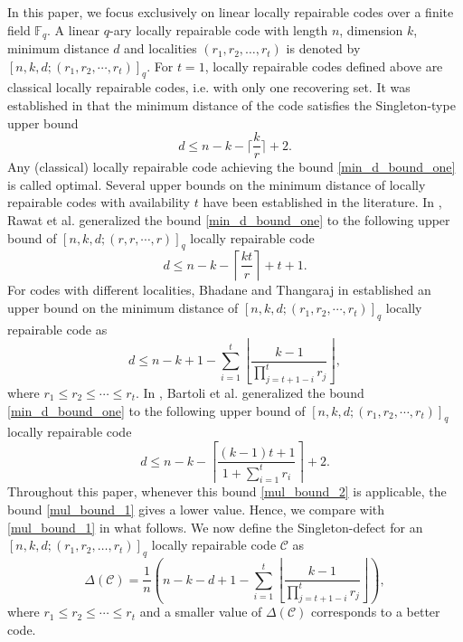 \documentclass[journal,12pt,onecolumn]{IEEEtran}
\begin{document}
In this paper, we focus exclusively on linear locally repairable codes over a finite field \( \mathbb{F}_q \). A linear \(q\)-ary locally repairable code with length \( n \), dimension \( k \), minimum distance \( d \) and localities \((r_1, r_2, \dots, r_t)\) is denoted by \([n, k, d; (r_1, r_2, \cdots, r_t)]_q\). For $t = 1$, locally repairable codes defined above are classical locally repairable codes, i.e. with only one recovering set. It was established in \cite{On_the_Locality_of_Codeword_Symbols} that the minimum distance of the code satisfies the Singleton-type upper bound
\begin{equation}\label{min_d_bound_one}
    d\le n-k-\bigg\lceil\frac{k}{r}\bigg\rceil+2.
\end{equation}
Any (classical) locally repairable code achieving the bound \eqref{min_d_bound_one} is called optimal. Several upper bounds on the minimum distance of locally repairable codes with availability $t$ have been established in the literature. In \cite{7398062}, Rawat et al. generalized the bound \eqref{min_d_bound_one} to the following upper bound of \([n, k, d; (r, r, \cdots, r)]_q\) locally repairable code
\begin{equation*}
    d \leq n - k - \left\lceil \frac{kt}{r} \right\rceil + t + 1. 
\end{equation*}
For codes with different localities, Bhadane and Thangaraj in \cite{8077091} established an upper bound on the minimum distance of \([n, k, d; (r_1, r_2, \cdots, r_t)]_q\) locally repairable code as
\begin{equation}\label{mul_bound_1}
    d \leq n - k + 1 - \sum_{i=1}^t \left\lfloor \frac{k-1}{\prod_{j=t+1-i}^t r_j} \right\rfloor,
\end{equation}
where \(r_1\le r_2\le\cdots\le r_t\). In \cite{Locally_Recoverable_Codes_From_Automorphism_Group_of_Function_Fields_of_Genus}, Bartoli et al. generalized the bound \eqref{min_d_bound_one} to the following upper bound of \([n, k, d; (r_1, r_2, \cdots, r_t)]_q\) locally repairable code
\begin{equation}\label{mul_bound_2}
    d \leq n - k - \left\lceil \frac{(k-1)t + 1}{1 + \sum_{i=1}^{t} r_i} \right\rceil + 2. 
\end{equation}
Throughout this paper, whenever this bound \eqref{mul_bound_2} is applicable, the bound \eqref{mul_bound_1} gives a lower value. Hence, we compare with \eqref{mul_bound_1} in what follows. We now define the Singleton-defect for an \([n, k, d; (r_1, r_2, \ldots, r_t)]_q\) locally repairable code \(\mathcal{C}\) as
\[
    \Delta(\mathcal{C}) = \frac{1}{n} \left( n - k - d + 1 - \sum_{i=1}^t \left\lfloor \frac{k-1}{\prod_{j=t+1-i}^t r_j} \right\rfloor \right), 
\]
where \(r_1\le r_2\le\cdots\le r_t\) and a smaller value of \(\Delta(\mathcal{C})\) corresponds to a better code. 
\end{document}
